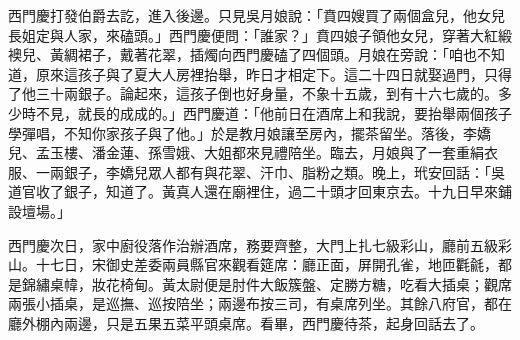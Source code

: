 西門慶打發伯爵去訖，進入後邊。只見吳月娘說：「賁四嫂買了兩個盒兒，他女兒長姐定與人家，來磕頭。」西門慶便問：「誰家？」賁四娘子領他女兒，穿著大紅緞襖兒、黃綢裙子，戴著花翠，插燭向西門慶磕了四個頭。月娘在旁說：「咱也不知道，原來這孩子與了夏大人房裡抬舉，昨日才相定下。這二十四日就娶過門，只得了他三十兩銀子。論起來，這孩子倒也好身量，不象十五歲，到有十六七歲的。多少時不見，就長的成成的。」西門慶道：「他前日在酒席上和我說，要抬舉兩個孩子學彈唱，不知你家孩子與了他。」於是教月娘讓至房內，擺茶留坐。落後，李嬌兒、孟玉樓、潘金蓮、孫雪娥、大姐都來見禮陪坐。臨去，月娘與了一套重絹衣服、一兩銀子，李嬌兒眾人都有與花翠、汗巾、脂粉之類。晚上，玳安回話：「吳道官收了銀子，知道了。黃真人還在廟裡住，過二十頭才回東京去。十九日早來鋪設壇場。」

西門慶次日，家中廚役落作治辦酒席，務要齊整，大門上扎七級彩山，廳前五級彩山。十七日，宋御史差委兩員縣官來觀看筵席：廳正面，屏開孔雀，地匝氍毹，都是錦繡桌幃，妝花椅甸。黃太尉便是肘件大飯簇盤、定勝方糖，吃看大插桌；觀席兩張小插桌，是巡撫、巡按陪坐；兩邊布按三司，有桌席列坐。其餘八府官，都在廳外棚內兩邊，只是五果五菜平頭桌席。看畢，西門慶待茶，起身回話去了。

